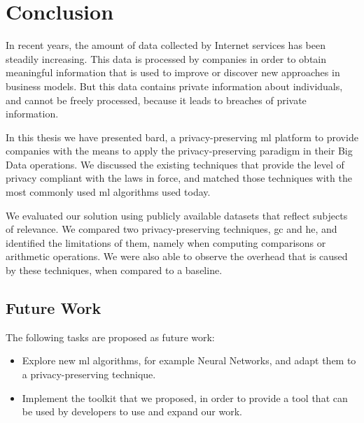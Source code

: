 %

\acresetall

\chapter{Conclusion}
\label{ch:ConclusionsAndFutureWork}


In recent years, the amount of data collected by Internet services has been steadily increasing. This data is processed by companies in order to obtain meaningful information that is used to improve or discover new approaches in business models. But this data contains private information about individuals, and cannot be freely processed, because it leads to breaches of private information.

In this thesis we have presented \acs{bard}, a privacy-preserving \ac{ml} platform to provide companies with the means to apply the privacy-preserving paradigm in their Big Data operations. We discussed the existing techniques that provide the level of privacy compliant with the laws in force, and matched those techniques with the most commonly used \ac{ml} algorithms used today.

We evaluated our solution using publicly available datasets that reflect subjects of relevance. We compared two privacy-preserving techniques, \ac{gc} and \ac{he}, and identified the limitations of them, namely when computing comparisons or arithmetic operations. We were also able to observe the overhead that is caused by these techniques, when compared to a baseline.



\section{Future Work}
\label{sec:FutureWork}


The following tasks are proposed as future work:

\begin{itemize}
	\item Explore new \ac{ml} algorithms, for example Neural Networks, and adapt them to a privacy-preserving technique.
	\item Implement the toolkit that we proposed, in order to provide a tool that can be used by developers to use and expand our work.
\end{itemize}


